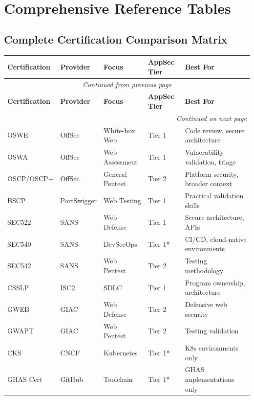 \documentclass[11pt,letterpaper]{article}
\begin{document}
\newpage

\section{Comprehensive Reference Tables}

\subsection{Complete Certification Comparison Matrix}

\begin{longtable}{p{2.5cm} p{2.5cm} p{2cm} p{2cm} p{4cm}}
\toprule
\textbf{Certification} & \textbf{Provider} & \textbf{Focus} & \textbf{AppSec Tier} & \textbf{Best For} \\
\midrule
\endfirsthead
\multicolumn{5}{c}{\textit{Continued from previous page}} \\
\toprule
\textbf{Certification} & \textbf{Provider} & \textbf{Focus} & \textbf{AppSec Tier} & \textbf{Best For} \\
\midrule
\endhead
\midrule
\multicolumn{5}{r}{\textit{Continued on next page}} \\
\endfoot
\bottomrule
\endlastfoot
OSWE & OffSec & White-box Web & Tier 1 & Code review, secure architecture \\
OSWA & OffSec & Web Assessment & Tier 1 & Vulnerability validation, triage \\
OSCP/OSCP+ & OffSec & General Pentest & Tier 2 & Platform security, broader context \\
BSCP & PortSwigger & Web Testing & Tier 1 & Practical validation skills \\
SEC522 & SANS & Web Defense & Tier 1 & Secure architecture, APIs \\
SEC540 & SANS & DevSecOps & Tier 1* & CI/CD, cloud-native environments \\
SEC542 & SANS & Web Pentest & Tier 2 & Testing methodology \\
CSSLP & ISC2 & SDLC & Tier 1 & Program ownership, architecture \\
GWEB & GIAC & Web Defense & Tier 2 & Defensive web security \\
GWAPT & GIAC & Web Pentest & Tier 2 & Testing validation \\
CKS & CNCF & Kubernetes & Tier 1* & K8s environments only \\
GHAS Cert & GitHub & Toolchain & Tier 1* & GHAS implementations only \\
\end{longtable}
\end{document}
